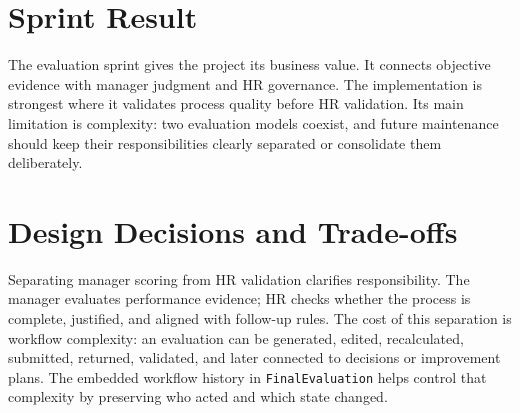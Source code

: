 \section{Sprint Result}
The evaluation sprint gives the project its business value. It connects objective evidence with manager judgment and HR governance. The implementation is strongest where it validates process quality before HR validation. Its main limitation is complexity: two evaluation models coexist, and future maintenance should keep their responsibilities clearly separated or consolidate them deliberately.

\section{Design Decisions and Trade-offs}
Separating manager scoring from HR validation clarifies responsibility. The manager evaluates performance evidence; HR checks whether the process is complete, justified, and aligned with follow-up rules. The cost of this separation is workflow complexity: an evaluation can be generated, edited, recalculated, submitted, returned, validated, and later connected to decisions or improvement plans. The embedded workflow history in \texttt{FinalEvaluation} helps control that complexity by preserving who acted and which state changed.
